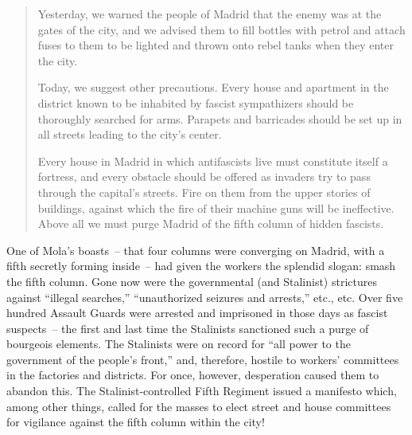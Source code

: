 \begin{quotation}
  Yesterday\kn, we warned the people of Madrid that the enemy was at the gates of the city\kn, and we advised them to fill bottles with petrol and attach fuses to them to be lighted and thrown onto rebel tanks when they enter the city.
  
  Today, we suggest other precautions. Every house and apartment in the district known to be inhabited by fascist sympathizers should be thoroughly searched for arms. Para\-pets and barricades should be set up in all streets leading to the city’s center.
  
  Every house in Madrid in which antifascists live must constitute itself a fortress, and every obstacle should be offered as invaders try to pass through the capital’s streets. Fire on them from the upper stories of buildings, against which the fire of their machine guns will be ineffective. Above all we must purge Madrid of the fifth column of hidden fascists.
\end{quotation}

One of Mola’s boasts~-- that four columns were converging on Madrid, with a fifth secretly forming inside~-- had given the workers the splendid slogan: smash the fifth column. Gone now were the governmental (and Stalinist) strictures against ``illegal searches,\kn\kn'' ``unauthorized seizures and arrests,\kn\kn'' etc., etc. Over five hundred Assault Guards were arrested and imprisoned in those days as fascist suspects~-- the first and last time the Stalinists sanctioned such a purge of bourgeois elements. The Stalinists were on record for ``all power to the government of the people’s front,\kn\kn'' and, therefore, hostile to workers’ committees in the factories and districts. For once, however, desperation caused them to abandon this. The Stalinist-controlled Fifth Regiment issued a manifesto which, among other things, called for the masses to elect street and house committees for vigilance against the fifth column within the city!\kp%

